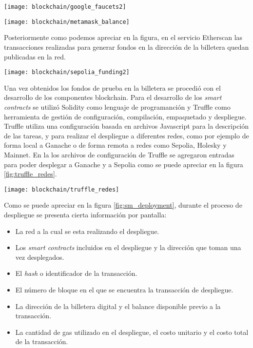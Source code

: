 \begin{center}
   \texttt{[image: blockchain/google\_faucets2]}
   \label{fig:google_faucets2}
\end{center}

\begin{center}
   \texttt{[image: blockchain/metamask\_balance]}
   \label{fig:metamask_balance}
\end{center}

Posteriormente como podemos apreciar en la figura, en el servicio Etherscan las transacciones realizadas para generar fondos en la dirección de la billetera quedan publicadas en la red.


\begin{center}
   \texttt{[image: blockchain/sepolia\_funding2]}
   \label{fig:sepolia_funding2}
\end{center}


Una vez obtenidos los fondos de prueba en la billetera se procedió con el desarrollo de los componentes blockchain. Para el desarrollo de los \textit{smart contracts} se utilizó Solidity como lenguaje de programanción y Truffle como herramienta de gestión de configuración, compilación, empaquetado y despliegue. Truffle utiliza una configuración basada en archivos Javascript para la descripción de las tareas, y para realizar el despliegue a diferentes redes, como por ejemplo de forma local a Ganache o de forma remota a redes como Sepolia, Holesky y Mainnet. En la los archivos de configuración de Truffle se agregaron entradas para poder desplegar a Ganache y a Sepolia como se puede apreciar en la figura \ref{fig:truffle_redes}.

\begin{center}
   \texttt{[image: blockchain/truffle\_redes]}
   \label{fig:truffle_redes}
\end{center}





Como se puede apreciar en la figura \ref{fig:sm_deployment}, durante el proceso de despliegue se presenta cierta información por pantalla:

\begin{itemize}
	\item La red a la cual se esta realizando el despliegue.
	\item Los \textit{smart contracts} incluidos en el despliegue y la dirección que toman una vez desplegados. 
	\item El \textit{hash} o identificador de la transacción.
	\item El número de bloque en el que se encuentra la transacción de despliegue.
	\item La dirección de la billetera digital y el balance disponible previo a la transacción.
	\item La cantidad de gas utilizado en el despliegue, el costo unitario y el costo total de la transacción.
\end{itemize}

